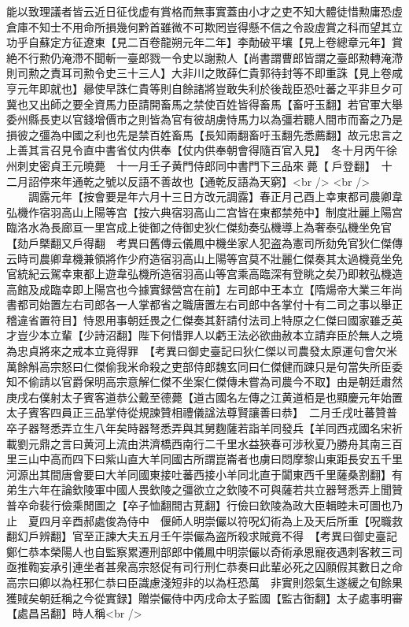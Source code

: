能以致理議者皆云近日征伐虚有賞格而無事實蓋由小才之吏不知大體徒惜勲庸恐虛倉庫不知士不用命所損幾何黔首雖微不可欺罔豈得懸不信之令設虛賞之科而望其立功乎自蘇定方征遼東【見二百卷龍朔元年二年】李勣破平壤【見上卷總章元年】賞絶不行勲仍淹滯不聞斬一臺郎戮一令史以謝勲人【尚書謂曹郎皆謂之臺郎勲轉淹滯則司勲之責耳司勲令史三十三人】大非川之敗薛仁貴郭待封等不即重誅【見上卷咸亨元年即就也】曏使早誅仁貴等則自餘諸將豈敢失利於後哉臣恐吐蕃之平非旦夕可冀也又出師之要全資馬力臣請開畜馬之禁使百姓皆得畜馬【畜吁玉翻】若官軍大舉委州縣長吏以官錢增價市之則皆為官有彼胡虜恃馬力以為彊若聽人間市而畜之乃是損彼之彊為中國之利也先是禁百姓畜馬【長知兩翻畜吁玉翻先悉薦翻】故元忠言之上善其言召見令直中書省仗内供奉【仗内供奉朝會得隨百官入見】　冬十月丙午徐州刺史密貞王元曉薨　十一月壬子黄門侍郎同中書門下三品來薨【戶登翻】　十二月詔停來年通乾之號以反語不善故也【通乾反語為天窮】<br />
<br />
　　調露元年【按會要是年六月十三日方改元調露】春正月己酉上幸東都司農卿韋弘機作宿羽高山上陽等宫【按六典宿羽高山二宫皆在東都禁苑中】制度壯麗上陽宫臨洛水為長廊亘一里宫成上徙御之侍御史狄仁傑劾奏弘機導上為奢泰弘機坐免官【劾戶槩翻又戶得翻　考異曰舊傳云儀鳳中機坐家人犯盗為憲司所劾免官狄仁傑傳云時司農卿韋機兼領將作少府造宿羽高山上陽等宫莫不壯麗仁傑奏其太過機竟坐免官統紀云駕幸東都上遊韋弘機所造宿羽高山等宫乘高臨深有登眺之矣乃即敕弘機造高館及成臨幸即上陽宫也今據實録營宫在前】左司郎中王本立【隋煬帝大業三年尚書都司始置左右司郎各一人掌都省之職唐置左右司郎中各掌付十有二司之事以舉正稽違省置符目】恃恩用事朝廷畏之仁傑奏其姧請付法司上特原之仁傑曰國家雖乏英才豈少本立輩【少詩沼翻】陛下何惜罪人以虧王法必欲曲赦本立請弃臣於無人之境為忠貞將來之戒本立竟得罪　【考異曰御史臺記曰狄仁傑以司農發太原運句會欠米萬餘斛高宗怒曰仁傑偷我米命殺之吏部侍郎魏玄同曰仁傑健而踈只是句當失所臣委知不偷請以官爵保明高宗意解仁傑不坐案仁傑傳未嘗為司農今不取】由是朝廷肅然　庚戌右僕射太子賓客道恭公戴至德薨【道古國名左傳之江黄道栢是也顯慶元年始置太子賓客四員正三品掌侍從規諫贊相禮儀諡法尊賢讓善曰恭】　二月壬戌吐蕃贊普卒子器弩悉弄立生八年矣時器弩悉弄與其舅麴薩若詣羊同發兵【羊同西戎國名宋祈載劉元鼎之言曰黄河上流由洪濟橋西南行二千里水益狹春可涉秋夏乃勝舟其南三百里三山中高而四下曰紫山直大羊同國古所謂崑崙者也虜曰悶摩黎山東距長安五千里河源出其間唐會要曰大羊同國東接吐蕃西接小羊同北直于闐東西千里薩桑割翻】有弟生六年在論欽陵軍中國人畏欽陵之彊欲立之欽陵不可與薩若共立器弩悉弄上聞贊普卒命裴行儉乘閒圖之【卒子恤翻間古莧翻】行儉曰欽陵為政大臣輯睦未可圖也乃止　夏四月辛酉郝處俊為侍中　偃師人明崇儼以符呪幻術為上及天后所重【呪職救翻幻戶辨翻】官至正諫大夫五月壬午崇儼為盗所殺求賊竟不得　【考異曰御史臺記鄭仁恭本榮陽人也自監察累遷刑部郎中儀鳳中明崇儼以奇術承恩寵夜遇刺客敕三司亟推鞫妄承引連坐者甚衆高宗怒促有司行刑仁恭奏曰此輩必死之囚願假其數日之命高宗曰卿以為枉邪仁恭曰臣識慮淺短非的以為枉恐萬　非實則怨氣生遂緩之旬餘果獲賊矣朝廷稱之今從實録】贈崇儼侍中丙戌命太子監國【監古衘翻】太子處事明審【處昌呂翻】時人稱<br />
